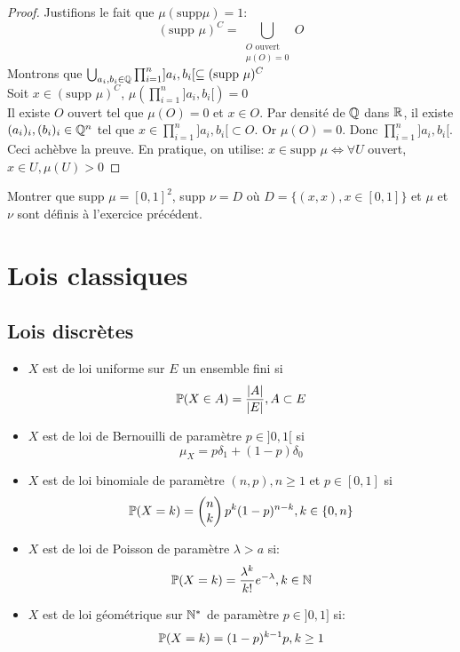 \documentclass[]{report}
\begin{document}
    \begin{proof}
        Justifions le fait que $\mu(\text{supp} \mu)=1$:
        \[(\text{supp }\mu)^C=\bigcup_{\substack{O\text{ ouvert}\\\mu(O)=0}}O\]
        Montrons que $\bigcup_{a_i,b_i\in\mathbb{Q}}\prod_{i=1}^{n}]a_i,b_i[\subseteq (\text{supp }\mu)^C$\\
        Soit $x\in (\text{supp }\mu)^C$, $\mu(\prod_{i=1}^{n}]a_i,b_i[)=0$\\
        Il existe $O$ ouvert tel que $\mu(O)=0$ et $x\in O$. Par densité de $\mathbb{Q}$ dans $\mathbb{R}$, il existe $(a_i)_i,(b_i)_i\in\mathbb{Q}^n$ tel que $x\in \prod_{i=1}^{n}]a_i,b_i[\subset O$. Or $\mu(O)=0$. Donc $\prod_{i=1}^{n}]a_i,b_i[$. Ceci achèbve la preuve. En pratique, on utilise: $x\in \text{supp }\mu \iff \forall U$ ouvert, $x\in U, \mu(U)>0$
    \end{proof}

    \begin{ex}{}{}
        Montrer que supp $\mu=[0,1]^2$, supp $\nu=D$ où $D=\{(x,x),x\in[0,1]\}$ et $\mu$ et $\nu$ sont définis à l'exercice précédent.
    \end{ex}

    \section{Lois classiques}

    \subsection*{Lois discrètes}

    \begin{itemize}
        \item $X$ est de loi uniforme sur $E$ un ensemble fini si
        \[\mathbb{P}(X\in A)=\frac{|A|}{|E|},A\subset E\]
        \item $X$ est de loi de Bernouilli de paramètre $p\in]0,1[$ si
        \[\mu_X=p\delta_1+(1-p)\delta_0\]
        \item $X$ est de loi binomiale de paramètre $(n,p), n\ge 1$ et $p\in[0,1]$ si
        \[\mathbb{P}(X=k)=\left(\begin{matrix}n\\ k \end{matrix}\right)p^k(1-p)^{n-k},k\in \{0,n\}\]
        \item $X$ est de loi de Poisson de paramètre $\lambda>a$ si:
        \[\mathbb{P}(X=k)=\frac{\lambda^k}{k!}e^{-\lambda},k\in \mathbb{N}\]
        \item $X$ est de loi géométrique sur $\mathbb{N}^*$ de paramètre $p\in]0,1]$ si:
        \[\mathbb{P}(X=k)=(1-p)^{k-1} p,k\ge 1\] 
    \end{itemize}
\end{document}
